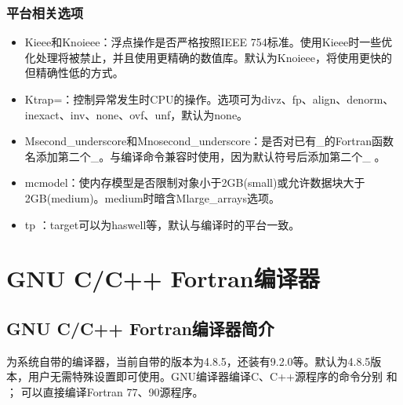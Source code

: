 \documentclass[a4paper,12pt,english]{sphinxmanual}
\begin{document}
\subsubsection{平台相关选项}
\label{\detokenize{compiler/pgi:id13}}\begin{itemize}
\item {} 
\sphinxAtStartPar
\sphinxhyphen{}Kieee和\sphinxhyphen{}Knoieee：浮点操作是否严格按照IEEE
754标准。使用\sphinxhyphen{}Kieee时一些优化处理将被禁止，并且使用更精确的数值库。默认为\sphinxhyphen{}Knoieee，将使用更快的但精确性低的方式。

\item {} 
\sphinxAtStartPar
\sphinxhyphen{}Ktrap=\sphinxstyleemphasis{{[}option,{[}option{]}…{]}}：控制异常发生时CPU的操作。选项可为divz、fp、align、denorm、inexact、inv、none、ovf、unf，默认为none。

\item {} 
\sphinxAtStartPar
\sphinxhyphen{}Msecond\_underscore和\sphinxhyphen{}Mnosecond\_underscore：是否对已有\_的Fortran函数名添加第二个\_。与编译命令兼容时使用，因为默认符号后添加第二个\_ 。

\item {} 
\sphinxAtStartPar
\sphinxhyphen{}mcmodel：使内存模型是否限制对象小于2GB(small)或允许数据块大于2GB(medium)。medium时暗含\sphinxhyphen{}Mlarge\_arrays选项。

\item {} 
\sphinxAtStartPar
\sphinxhyphen{}tp ：target可以为haswell等，默认与编译时的平台一致。

\end{itemize}

\sphinxstepscope


\section{GNU C/C++ Fortran编译器}
\label{\detokenize{compiler/gnu:gnu-c-c-fortran}}\label{\detokenize{compiler/gnu::doc}}

\subsection{GNU C/C++ Fortran编译器简介}
\label{\detokenize{compiler/gnu:id1}}
\sphinxAtStartPar
{} 为系统自带的编译器，当前自带的版本为4.8.5，还装有9.2.0等。默认为4.8.5版本，用户无需特殊设置即可使用。GNU编译器编译C、C++源程序的命令分别  和  ；  可以直接编译Fortran 77、90源程序。
\end{document}
